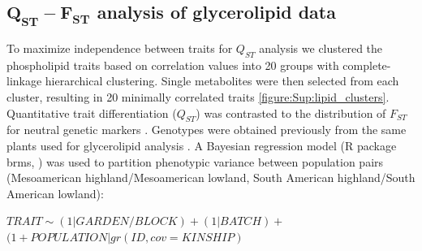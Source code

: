 \documentclass[9pt,twocolumn,twoside,lineno]{biorxiv}
\begin{document}
\subsection{$\mathbf{Q_{ST}-F_{ST}}$ analysis of glycerolipid data}
To maximize independence between traits for $Q_{ST}$ analysis we clustered the phospholipid traits based on correlation values into 20 groups with complete-linkage hierarchical clustering. Single metabolites were then selected from each cluster, resulting in 20 minimally correlated traits \cref{figure:Sup:lipid_clusters}.
Quantitative trait differentiation ($Q_{ST}$) was contrasted to the distribution of $F_{ST}$ for neutral genetic markers \cite{whitlock2008evolutionary}. 
Genotypes were obtained previously from the same plants used for glycerolipid analysis \cite{Janzen2021-lz}.
A Bayesian regression model (R package brms, \cite{burkner2017brms}) was used to partition phenotypic variance between population pairs (Mesoamerican highland/Mesoamerican lowland, South American highland/South American lowland):

\begin{center}
${ TRAIT \sim (1|GARDEN/BLOCK) + (1|BATCH) + }$\\
${(1 + POPULATION|gr(ID, cov = KINSHIP)}$
\end{center}
\end{document}
